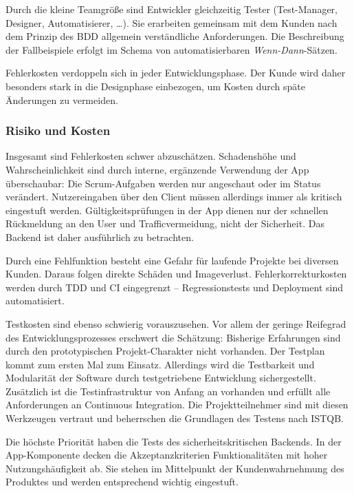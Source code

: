 Durch die kleine Teamgröße sind Entwickler gleichzeitig Tester (Test-Manager, Designer, Automatisierer, \dots).
Sie erarbeiten gemeinsam mit dem Kunden nach dem Prinzip des \ac{BDD} allgemein verständliche Anforderungen. Die Beschreibung der Fallbeispiele erfolgt im Schema von automatisierbaren \textit{Wenn-Dann}-Sätzen.

Fehlerkosten verdoppeln sich in jeder Entwicklungsphase. Der Kunde wird daher besonders stark in die Designphase einbezogen, um Kosten durch späte Änderungen zu vermeiden.

\subsubsection{Risiko und Kosten}
Insgesamt sind Fehlerkosten schwer abzuschätzen. Schadenshöhe und Wahrscheinlichkeit sind durch interne, ergänzende Verwendung der App überschaubar: Die Scrum-Aufgaben werden nur angeschaut oder im Status verändert. Nutzereingaben über den Client müssen allerdings immer als kritisch eingestuft werden. Gültigkeitsprüfungen in der App dienen nur der schnellen Rückmeldung an den User und Trafficvermeidung, nicht der Sicherheit. Das Backend ist daher ausführlich zu betrachten. 

Durch eine Fehlfunktion besteht eine Gefahr für laufende Projekte bei diversen Kunden. Daraus folgen direkte Schäden und Imageverlust. Fehlerkorrekturkosten werden durch TDD und CI eingegrenzt -- Regressionstests und Deployment sind automatisiert.

Testkosten sind ebenso schwierig vorauszusehen. Vor allem der geringe Reifegrad des Entwicklungsprozesses erschwert die Schätzung: Bisherige Erfahrungen sind durch den prototypischen Projekt-Charakter nicht vorhanden. Der Testplan kommt zum ersten Mal zum Einsatz. Allerdings wird die Testbarkeit und Modularität der Software durch testgetriebene Entwicklung sichergestellt. Zusätzlich ist die Testinfrastruktur von Anfang an vorhanden und erfüllt alle Anforderungen an Continuous Integration. Die Projektteilnehmer sind mit diesen Werkzeugen vertraut und beherrschen die Grundlagen des Testens nach ISTQB.

Die höchste Priorität haben die Tests des sicherheitskritischen Backends. In der App-Komponente decken die Akzeptanzkriterien Funktionalitäten mit hoher Nutzungshäufigkeit ab. Sie stehen im Mittelpunkt der Kundenwahrnehmung des Produktes und werden entsprechend wichtig eingestuft. 

